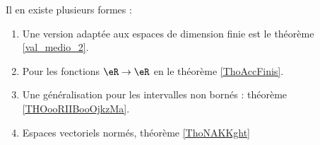 
    Il en existe plusieurs formes :
    \begin{enumerate}
        \item
            Une version adaptée aux espaces de dimension finie est le théorème \ref{val_medio_2}.
        \item
            Pour les fonctions \( \eR\to \eR\) en le théorème \ref{ThoAccFinis}.
        \item
            Une généralisation pour les intervalles non bornés : théorème \ref{THOooRIIBooOjkzMa}.
        \item
            Espaces vectoriels normés, théorème \ref{ThoNAKKght}
    \end{enumerate}

